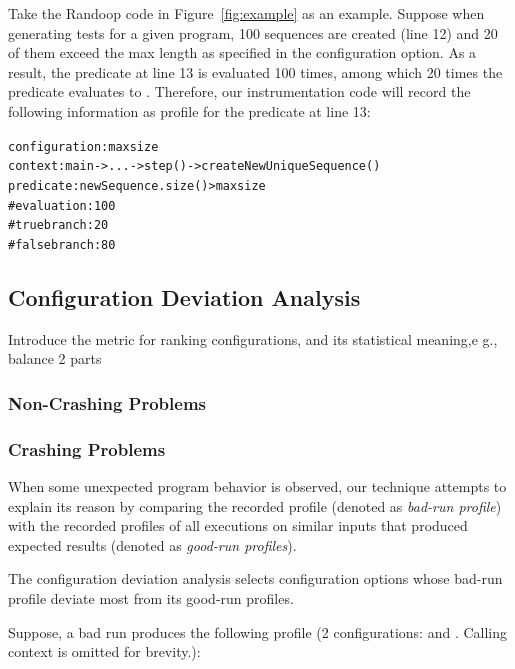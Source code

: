 Take the Randoop code in Figure~\ref{fig:example} as an example. Suppose when
generating tests for a given program, 100 sequences are created (line 12) and 20
of them exceed the max length as specified in the  configuration option.
As a result, the predicate at line 13 is evaluated 100 times, among which 20 times the
predicate evaluates to . Therefore,
our instrumentation code will record the following information as profile for the predicate
at line 13:


\begin{CodeOut}
\begin{alltt}
configuration: maxsize
context: main -> ... -> step() - > createNewUniqueSequence()
predicate: newSequence.size() > maxsize
    \# evaluation: 100
    \# true branch: 20
    \# false branch: 80
\end{alltt}
\end{CodeOut}

\subsection{Configuration Deviation Analysis}
\label{sec:analysis}


Introduce the metric for ranking configurations, and its
statistical meaning,e g., balance 2 parts

\subsubsection{Non-Crashing Problems}

\subsubsection{Crashing Problems}

When some unexpected program behavior is observed, our technique
attempts to explain its reason by comparing the recorded profile (denoted
as \textit{bad-run profile}) with the recorded profiles of all
executions on similar inputs that produced expected results (denoted as \textit{good-run profiles}).

The configuration deviation analysis selects configuration
options whose bad-run profile deviate most from its good-run profiles.

Suppose, a bad run produces the following profile (2 configurations: 
and . Calling context is omitted for brevity.):


